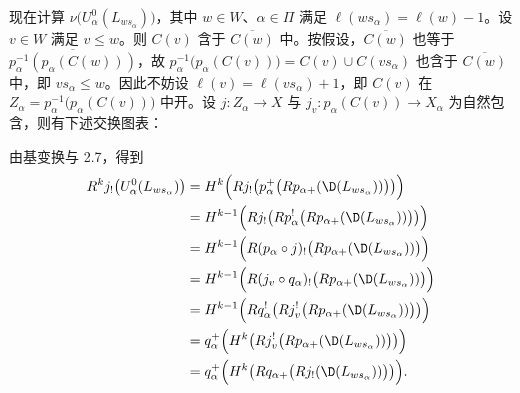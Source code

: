 现在计算 $\nu\bigl(U^0_\alpha(L_{ws_\alpha})\bigr)$，其中 $w\in W$、$\alpha\in\Pi$ 满足 $\ell(ws_\alpha)=\ell(w)-1$。设 $v\in W$ 满足 $v\leq w$。则 $C(v)$ 含于 $\overline{C(w)}$ 中。按假设，$\overline{C(w)}$ 也等于 $\overline{p_\alpha^{-1}(p_\alpha(C(w)))}$，故 $p_\alpha^{-1}\bigl(p_\alpha(C(v))\bigr)=C(v)\cup C(vs_\alpha)$ 也含于 $\overline{C(w)}$ 中，即 $vs_\alpha\leq w$。因此不妨设 $\ell(v)=\ell(vs_\alpha)+1$，即 $C(v)$ 在 $Z_\alpha=p_\alpha^{-1}\bigl(p_\alpha(C(v))\bigr)$ 中开。设 $j:Z_\alpha\to X$ 与 $j_v:p_\alpha(C(v))\to X_\alpha$ 为自然包含，则有下述交换图表：
\begin{center}
\end{center}
由基变换与 2.7，得到
\begin{align*}
R^kj_!\bigl(U^0_\alpha(L_{ws_\alpha})\bigr)
&=H^k\Bigl(Rj_!\bigl(p^+_\alpha\bigl(Rp_{\alpha+}(\D(L_{ws_\alpha}))\bigr)\bigr)\Bigr)\\
&=H^{k-1}\Bigl(Rj_!\bigl(Rp^!_\alpha\bigl(Rp_{\alpha+}(\D(L_{ws_\alpha}))\bigr)\bigr)\Bigr)\\
&=H^{k-1}\Bigl(R(p_\alpha\circ j)_!\bigl(Rp_{\alpha+}(\D(L_{ws_\alpha}))\bigr)\Bigr)\\
&=H^{k-1}\Bigl(R(j_v\circ q_\alpha)_!\bigl(Rp_{\alpha+}(\D(L_{ws_\alpha}))\bigr)\Bigr)\\
&=H^{k-1}\Bigl(Rq^!_\alpha\bigl(Rj^!_v\bigl(Rp_{\alpha+}(\D(L_{ws_\alpha}))\bigr)\bigr)\Bigr)\\
&=q^+_\alpha\Bigl(H^k\bigl(Rj^!_v\bigl(Rp_{\alpha+}(\D(L_{ws_\alpha}))\bigr)\bigr)\Bigr)\\
&=q^+_\alpha\Bigl(H^k\bigl(Rq_{\alpha+}\bigl(Rj_!(\D(L_{ws_\alpha}))\bigr)\bigr)\Bigr).
\end{align*}

